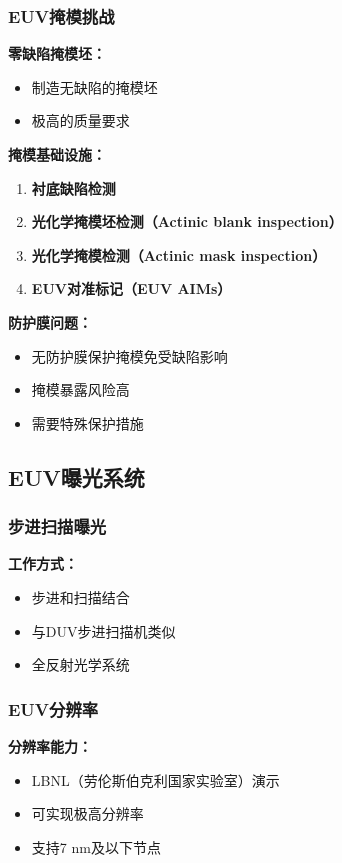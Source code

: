 \documentclass[UTF8,12pt,a4paper]{ctexart}
\begin{document}
\subsubsection{EUV掩模挑战}

\textbf{零缺陷掩模坯：}
\begin{itemize}
    \item 制造无缺陷的掩模坯
    \item 极高的质量要求
\end{itemize}

\textbf{掩模基础设施：}
\begin{enumerate}
    \item \textbf{衬底缺陷检测}
    \item \textbf{光化学掩模坯检测（Actinic blank inspection）}
    \item \textbf{光化学掩模检测（Actinic mask inspection）}
    \item \textbf{EUV对准标记（EUV AIMs）}
\end{enumerate}

\textbf{防护膜问题：}
\begin{itemize}
    \item 无防护膜保护掩模免受缺陷影响
    \item 掩模暴露风险高
    \item 需要特殊保护措施
\end{itemize}

\subsection{EUV曝光系统}

\subsubsection{步进扫描曝光}

\textbf{工作方式：}
\begin{itemize}
    \item 步进和扫描结合
    \item 与DUV步进扫描机类似
    \item 全反射光学系统
\end{itemize}

\subsubsection{EUV分辨率}

\textbf{分辨率能力：}
\begin{itemize}
    \item LBNL（劳伦斯伯克利国家实验室）演示
    \item 可实现极高分辨率
    \item 支持7 nm及以下节点
\end{itemize}
\end{document}
